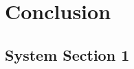 %
\chapter{Conclusion}
\label{ch:conclusion}

\Blindtext[2][1]

\section{System Section 1}
\label{sec:conclusion:sec1}

